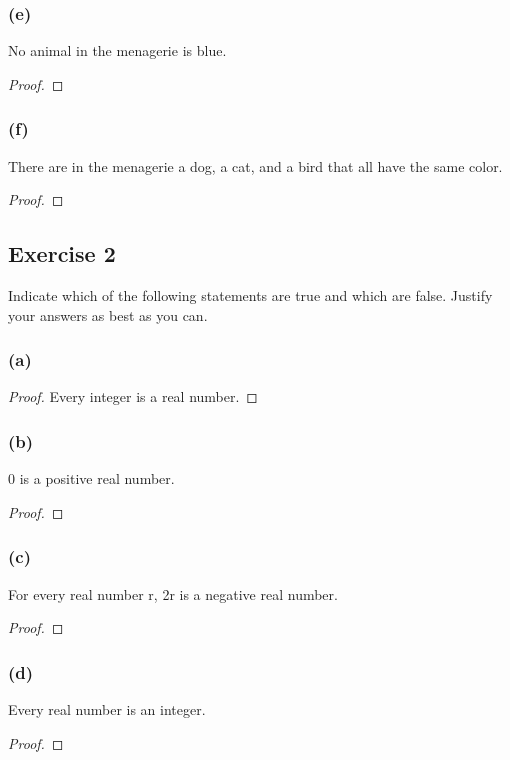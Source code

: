 \documentclass[14pt]{extarticle}
\begin{document}
\subsubsection{(e)}
No animal in the menagerie is blue.

\begin{proof}

\end{proof}

\subsubsection{(f)}
There are in the menagerie a dog, a cat, and a bird that all have the same color.
\begin{proof}

\end{proof}

\subsection{Exercise 2}
Indicate which of the following statements are true and which are false. Justify your answers as best as you can.

\subsubsection{(a)}

\begin{proof}
Every integer is a real number.
\end{proof}

\subsubsection{(b)}
0 is a positive real number.
\begin{proof}

\end{proof}

\subsubsection{(c)}
For every real number r, 2r is a negative real number.
\begin{proof}

\end{proof}

\subsubsection{(d)}
Every real number is an integer.
\begin{proof}

\end{proof}
\end{document}
